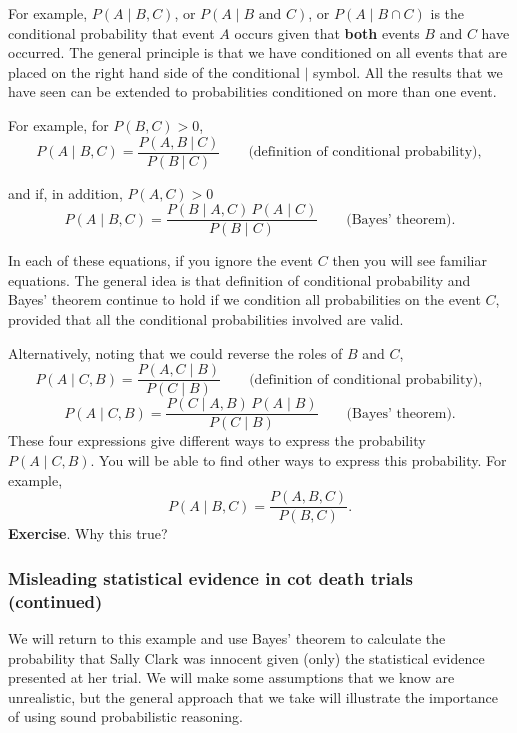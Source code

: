 \documentclass[
  11pt,
  british,
  openany, a4paper]{book}
\begin{document}
For example, \(P(A \mid B , C)\), or \(P(A \mid B \mbox{ and } C)\), or \(P(A \mid B \cap C)\) is the conditional probability that event \(A\) occurs given that \textbf{both} events \(B\) and \(C\) have occurred. The general principle is that we have conditioned on all events that are placed on the right hand side of the conditional \(\mid\) symbol. All the results that we have seen can be extended to probabilities conditioned on more than one event.

For example, for \(P(B, C)>0\),
\[ P(A \mid B, C) = \frac{P(A , B~|~C)}{P(B~|~C)} \qquad \mbox{(definition of conditional probability)}, \]

and if, in addition, \(P(A, C)>0\)
\[ P(A \mid B, C) = \frac{P(B \mid A, C)\,P(A \mid C)}{P(B \mid C)} \qquad \mbox{(Bayes' theorem)}. \]

In each of these equations, if you ignore the event \(C\) then you will see familiar equations. The general idea is that definition of conditional probability and Bayes' theorem continue to hold if we condition all probabilities on the event \(C\), provided that all the conditional probabilities involved are valid.

Alternatively, noting that we could reverse the roles of \(B\) and \(C\),
\[ P(A \mid C, B) = \frac{P(A , C \mid B)}{P(C \mid B)} \qquad \mbox{(definition of conditional probability)}, \]
\[ P(A \mid C, B) = \frac{P(C \mid A, B)\,P(A \mid B)}{P(C \mid B)} \qquad \mbox{(Bayes' theorem)}. \]
These four expressions give different ways to express the probability \(P(A \mid C, B)\). You will be able to find other ways to express this probability. For example,\\
\[ P(A \mid B,C) = \frac{P(A, B, C)}{P(B, C)}. \]
\textbf{Exercise}. Why this true?

\hypertarget{misleading-statistical-evidence-in-cot-death-trials-continued}{%
\subsubsection*{Misleading statistical evidence in cot death trials (continued)}\label{misleading-statistical-evidence-in-cot-death-trials-continued}}

We will return to this example and use Bayes' theorem to calculate the probability that Sally Clark was innocent given (only) the statistical evidence presented at her trial. We will make some assumptions that we know are unrealistic, but the general approach that we take will illustrate the importance of using sound probabilistic reasoning.
\end{document}
